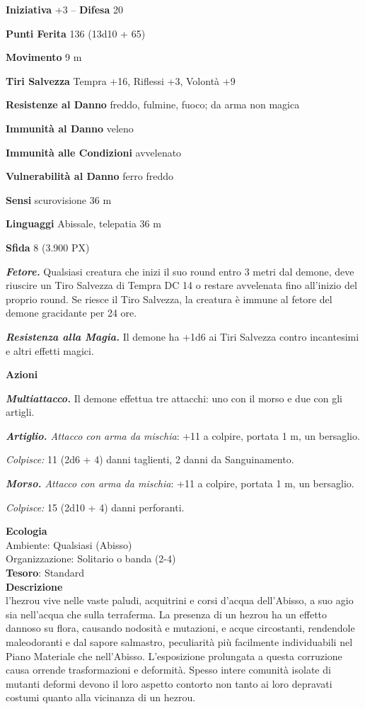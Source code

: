 \begin{multicols}{2}
\textbf{Iniziativa} +3 -- \textbf{Difesa} 20

\textbf{Punti Ferita} 136 (13d10 + 65)

\textbf{Movimento} 9 m

\textbf{Tiri Salvezza} Tempra +16, Riflessi +3, Volontà +9

\textbf{Resistenze al Danno} freddo, fulmine, fuoco; da arma non magica

\textbf{Immunità al Danno} veleno

\textbf{Immunità alle Condizioni} avvelenato

\textbf{Vulnerabilità al Danno} ferro freddo

\textbf{Sensi} scurovisione 36 m

\textbf{Linguaggi} Abissale, telepatia 36 m

\textbf{Sfida} 8 (3.900 PX)

\textit{\textbf{Fetore.}} Qualsiasi creatura che inizi il suo round entro 3 metri dal demone, deve riuscire un Tiro Salvezza di Tempra DC 14 o restare avvelenata fino all'inizio del proprio round. Se riesce il Tiro Salvezza, la creatura è immune al fetore del demone gracidante per 24 ore.

\textit{\textbf{Resistenza alla Magia.}} Il demone ha +1d6 ai Tiri Salvezza contro incantesimi e altri effetti magici.

\textbf{Azioni}

\textit{\textbf{Multiattacco.}} Il demone effettua tre attacchi: uno con il morso e due con gli artigli.

\textit{\textbf{Artiglio.} Attacco con arma da mischia}: +11 a colpire, portata 1 m, un bersaglio.

\textit{Colpisce:} 11 (2d6 + 4) danni taglienti, 2 danni da Sanguinamento.

\textit{\textbf{Morso.} Attacco con arma da mischia}: +11 a colpire, portata 1 m, un bersaglio.

\textit{Colpisce:} 15 (2d10 + 4) danni perforanti.

\textbf{Ecologia}\\
Ambiente: Qualsiasi (Abisso)\\
Organizzazione: Solitario o banda (2-4)\\
\textbf{Tesoro}: Standard\\
\textbf{Descrizione}\\
l'hezrou vive nelle vaste paludi, acquitrini e corsi d'acqua dell'Abisso, a suo agio sia nell'acqua che sulla terraferma. La presenza di un hezrou ha un effetto dannoso su flora, causando nodosità e mutazioni, e acque circostanti, rendendole maleodoranti e dal sapore salmastro, peculiarità più facilmente individuabili nel Piano Materiale che nell'Abisso. L'esposizione prolungata a questa corruzione causa orrende trasformazioni e deformità. Spesso intere comunità isolate di mutanti deformi devono il loro aspetto contorto non tanto ai loro depravati costumi quanto alla vicinanza di un hezrou.


\end{multicols}
